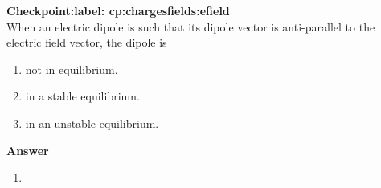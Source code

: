 \begin{framed}
\textbf{Checkpoint:label: cp:chargesfields:efield}\\
When an electric dipole is such that its dipole vector is anti-parallel to the electric field vector, the dipole is

\begin{enumerate}
\item not in equilibrium.
\item in a stable equilibrium.
\item in an unstable equilibrium.
\end{enumerate}

\begin{framed}
\textbf{Answer}\\
\begin{enumerate}[resume]
\item
\end{enumerate}
\end{framed}
\end{framed}

